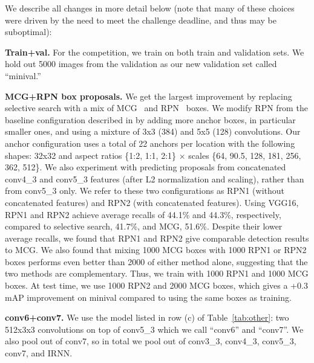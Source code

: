\documentclass[10pt,twocolumn,letterpaper]{article}
\begin{document}
We describe all changes in more detail below (note that many of these choices
were driven by the need to meet the challenge deadline, and thus may be
suboptimal):
\begin{packed_enum}
%
  \item \textbf{Train+val.}  For the competition, we train on both train and
    validation sets.  We hold out 5000 images from the validation as our new
    validation set called ``minival.''
%
  \item \textbf{MCG+RPN box proposals.} We get the largest improvement by
    replacing selective search with a mix of MCG~\cite{MCG-PABMM2015} and
    RPN~\cite{ren2015faster} boxes.  We modify RPN from the baseline
    configuration described in
    \cite{ren2015faster} by adding more anchor boxes, in particular
    smaller ones, and using a mixture of 3x3 (384) and 5x5 (128) convolutions.
    Our anchor configuration uses a total of 22 anchors per location
    with the following shapes:
    32x32 and aspect ratios \{1:2, 1:1, 2:1\} $\times$ scales \{64, 90.5, 128,
    181, 256, 362, 512\}.
    We also experiment with predicting proposals from concatenated conv4\_3
    and conv5\_3 features (after L2 normalization and scaling), rather than
    from conv5\_3 only. We refer to these two configurations as RPN1
    (without concatenated features) and RPN2 (with concatenated features).
    Using VGG16, RPN1 and RPN2 achieve average recalls of 44.1\% and 44.3\%, respectively,
    compared to selective search, 41.7\%, and MCG, 51.6\%.
    Despite their lower average recalls, we found that RPN1 and RPN2 give
    comparable detection results to MCG.
    We also found that mixing 1000 MCG boxes with 1000 RPN1 or RPN2 boxes
    performs even better than 2000 of either method alone, suggesting that the
    two methods are complementary.
    Thus, we train with 1000 RPN1 and 1000 MCG boxes. At test time, we use 1000
    RPN2 and 2000 MCG boxes, which gives a +0.3 mAP improvement on minival
    compared to using the same boxes as training.
%
  \item \textbf{conv6+conv7.}  We use the model listed in row (c) of
    Table~\ref{tab:other}: two 512x3x3 convolutions on top of conv5\_3 which we
    call ``conv6'' and ``conv7''.  We also pool out of conv7, so in total we
    pool out of conv3\_3, conv4\_3, conv5\_3, conv7, and IRNN.

\end{packed_enum}
\end{document}
